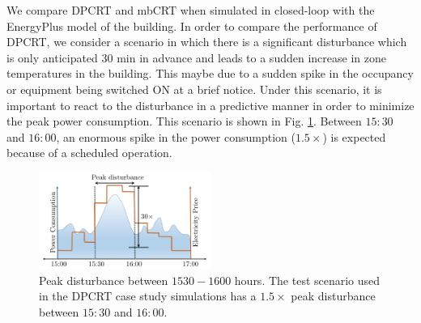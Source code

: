 We compare DPCRT and mbCRT when simulated in closed-loop with the EnergyPlus model of the building. In order to compare the performance of DPCRT, we consider a scenario in which there is a significant disturbance which is only anticipated $30$ min in advance and leads to a sudden increase in zone temperatures in the building. This maybe due to a sudden spike in the occupancy or equipment being switched ON at a brief notice. Under this scenario, it is important to react to the disturbance in a predictive manner in order to minimize the peak power consumption. This scenario is shown in Fig. \ref{F:scenario}. Between $15:30$ and $16:00$, an enormous spike in the power consumption ($1.5\times$) is expected because of a scheduled operation.
\begin{figure}
	\centering
	\hspace{1pt}
	\includegraphics[width=0.5\textwidth]{figs/peakpowerplot.pdf}
	\centering
	\caption{Peak disturbance between $1530-1600$ hours. The test scenario used in the DPCRT case study simulations has a $1.5\times$ peak disturbance between $15{:}30$ and $16{:}00$.}
	\label{F:scenario}
	\vspace{-10pt}
\end{figure}
